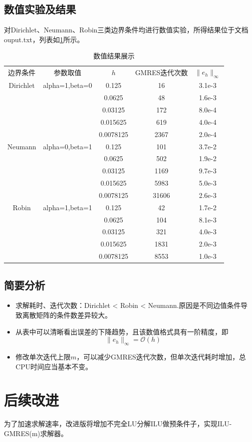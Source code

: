 \documentclass[11pt,a4 paper,one side]{article}
\begin{document}
\subsection{数值实验及结果}
对Dirichlet、Neumann、Robin三类边界条件均进行数值实验，所得结果位于文档ouput.txt，列表如\ref{数值结果展示}所示。
\begin{table}
    \centering
    \begin{tabular}{c c c c c}
        \hline
        边界条件&参数取值&$h$&GMRES迭代次数&$\|e_h\|_{\infty}$\\
        Dirichlet&alpha=1,beta=0&0.125&16&3.1e-3\\
        &&0.0625&48&1.6e-3\\
        &&0.03125&172&8.0e-4\\
        &&0.015625&619&4.0e-4\\
        &&0.0078125&2367&2.0e-4\\
        \hline
        Neumann&alpha=0,beta=1&0.125&101&3.7e-2\\
        &&0.0625&502&1.9e-2\\
        &&0.03125&1169&9.7e-3\\
        &&0.015625&5983&5.0e-3\\
        &&0.0078125&31606&2.6e-3\\
        \hline
        Robin&alpha=1,beta=1&0.125&42&1.7e-2\\
        &&0.0625&104&8.1e-3\\
        &&0.03125&321&4.0e-3\\
        &&0.015625&1831&2.0e-3\\
        &&0.0078125&8553&1.0e-3\\
        \hline
    \end{tabular}
    \caption{数值结果展示}
    \label{数值结果展示}
\end{table}
\subsection{简要分析}
\begin{itemize}
    \item 求解耗时、迭代次数：Dirichlet < Robin < Neumann.原因是不同边值条件导致离散矩阵的条件数差异较大。
    \item 从表中可以清晰看出误差的下降趋势，且该数值格式具有一阶精度，即\begin{equation}
          \|e_h\|_{\infty} = \mathcal{O}(h)
          \end{equation}
    \item 修改单次迭代上限$m$，可以减少GMRES迭代次数，但单次迭代耗时增加，总CPU时间应当基本不变。
\end{itemize}
\section{后续改进}
为了加速求解速率，改进版将增加不完全LU分解ILU做预条件子，实现ILU-GMRES(m)求解器。
\end{document}

